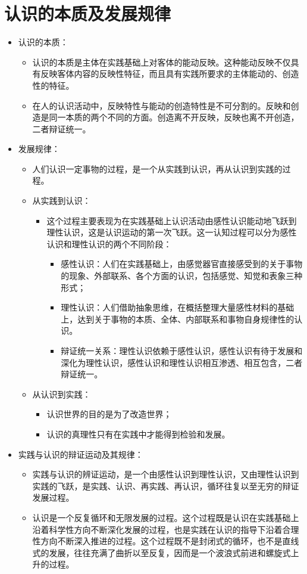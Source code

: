 \documentclass[12pt,openany]{ctexbook}
\begin{document}
\section{认识的本质及发展规律}
\begin{itemize}
  \item 认识的本质：
\begin{itemize}
  \item 认识的本质是主体在实践基础上对客体的能动反映。这种能动反映不仅具有反映客体内容的反映性特征，而且具有实践所要求的主体能动的、创造性的特征。
  \item 在人的认识活动中，反映特性与能动的创造特性是不可分割的。反映和创造是同一本质的两个不同的方面。创造离不开反映，反映也离不开创造，二者辩证统一。
\end{itemize}
  \item 发展规律：
\begin{itemize}
  \item 人们认识一定事物的过程，是一个从实践到认识，再从认识到实践的过程。
  \item 从实践到认识：
\begin{itemize}
  \item 这个过程主要表现为在实践基础上认识活动由感性认识能动地飞跃到理性认识，这是认识运动的第一次飞跃。这一认知过程可以分为感性认识和理性认识的两个不同阶段：
\begin{itemize}
  \item 感性认识：人们在实践基础上，由感觉器官直接感受到的关于事物的现象、外部联系、各个方面的认识，包括感觉、知觉和表象三种形式；
  \item 理性认识：人们借助抽象思维，在概括整理大量感性材料的基础上，达到关于事物的本质、全体、内部联系和事物自身规律性的认识。
  \item 辩证统一关系：理性认识依赖于感性认识，感性认识有待于发展和深化为理性认识，感性认识和理性认识相互渗透、相互包含，二者辩证统一。
\end{itemize}
\end{itemize}
  \item 从认识到实践：
\begin{itemize}
  \item 认识世界的目的是为了改造世界；
  \item 认识的真理性只有在实践中才能得到检验和发展。
\end{itemize}
\end{itemize}
  \item 实践与认识的辩证运动及其规律：
\begin{itemize}
  \item 实践与认识的辨证运动，是一个由感性认识到理性认识，又由理性认识到实践的飞跃，是实践、认识、再实践、再认识，循环往复以至无穷的辩证发展过程。
  \item 认识是一个反复循环和无限发展的过程。这个过程既是认识在实践基础上沿着科学性方向不断深化发展的过程，也是实践在认识的指导下沿着合理性方向不断深入推进的过程。这个过程既不是封闭式的循环，也不是直线式的发展，往往充满了曲折以至反复，因而是一个波浪式前进和螺旋式上升的过程。
\end{itemize}
\end{itemize}
\end{document}
